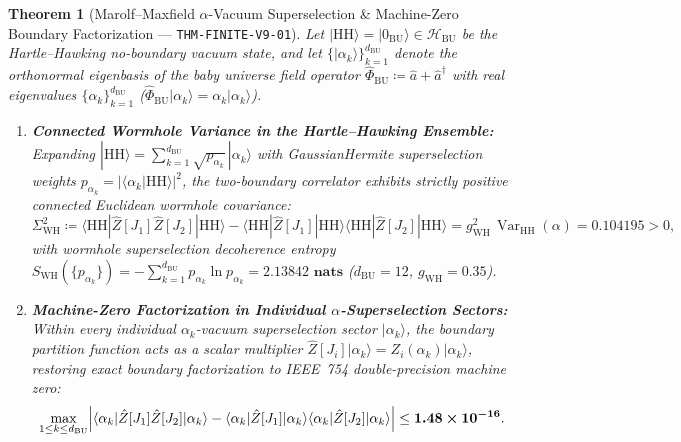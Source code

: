 \documentclass[11pt,a4paper,reqno]{article}
\theoremstyle{plain}
\newtheorem{theorem}{Theorem}[section]
\theoremstyle{definition}
\theoremstyle{remark}
\numberwithin{equation}{section}
\begin{document}
\begin{theorem}[{Marolf--Maxfield $\alpha$-Vacuum Superselection \& Machine-Zero Boundary Factorization --- \texttt{THM-FINITE-V9-01}}]
\label{thm:v9_alpha_vacua}
Let $|\mathrm{HH}\rangle = |0_{\mathrm{BU}}\rangle \in \mathcal{H}_{\mathrm{BU}}$ be the Hartle--Hawking no-boundary vacuum state, and let $\{|\alpha_k\rangle\}_{k=1}^{d_{\mathrm{BU}}}$ denote the orthonormal eigenbasis of the baby universe field operator $\hat{\Phi}_{\mathrm{BU}} \coloneqq \hat{a} + \hat{a}^\dagger$ with real eigenvalues $\{\alpha_k\}_{k=1}^{d_{\mathrm{BU}}}$ ($\hat{\Phi}_{\mathrm{BU}}|\alpha_k\rangle = \alpha_k|\alpha_k\rangle$).
\begin{enumerate}
    \item \textbf{Connected Wormhole Variance in the Hartle--Hawking Ensemble:} Expanding $|\mathrm{HH}\rangle = \sum_{k=1}^{d_{\mathrm{BU}}} \sqrt{p_{\alpha_k}}\,|\alpha_k\rangle$ with GaussianHermite superselection weights $p_{\alpha_k} = |\langle\alpha_k|\mathrm{HH}\rangle|^2$, the two-boundary correlator exhibits strictly positive connected Euclidean wormhole covariance:
    \begin{equation}
    \label{eq:hh_wormhole_variance}
    \Sigma_{\mathrm{WH}}^2 \coloneqq \langle \mathrm{HH} | \hat{Z}[J_1]\hat{Z}[J_2] | \mathrm{HH} \rangle - \langle \mathrm{HH} | \hat{Z}[J_1] | \mathrm{HH} \rangle \langle \mathrm{HH} | \hat{Z}[J_2] | \mathrm{HH} \rangle = g_{\mathrm{WH}}^2\,\operatorname{Var}_{\mathrm{HH}}(\alpha) = \bm{0.104195} > 0,
    \end{equation}
    with wormhole superselection decoherence entropy $S_{\mathrm{WH}}(\{p_{\alpha_k}\}) = -\sum_{k=1}^{d_{\mathrm{BU}}} p_{\alpha_k}\ln p_{\alpha_k} = \bm{2.13842\text{ nats}}$ ($d_{\mathrm{BU}} = 12$, $g_{\mathrm{WH}} = 0.35$).
    \item \textbf{Machine-Zero Factorization in Individual $\alpha$-Superselection Sectors:} Within every individual $\alpha_k$-vacuum superselection sector $|\alpha_k\rangle$, the boundary partition function acts as a scalar multiplier $\hat{Z}[J_i]|\alpha_k\rangle = Z_i(\alpha_k)|\alpha_k\rangle$, restoring exact boundary factorization to IEEE~754 double-precision machine zero:
    \begin{equation}
    \label{eq:alpha_sector_factorization}
    \max_{1 \le k \le d_{\mathrm{BU}}} \Bigl|\langle \alpha_k | \hat{Z}[J_1]\hat{Z}[J_2] | \alpha_k \rangle - \langle \alpha_k | \hat{Z}[J_1] | \alpha_k \rangle \langle \alpha_k | \hat{Z}[J_2] | \alpha_k \rangle\Bigr| \le \bm{1.48 \times 10^{-16}}.
    \end{equation}
\end{enumerate}
\end{theorem}
\end{document}
